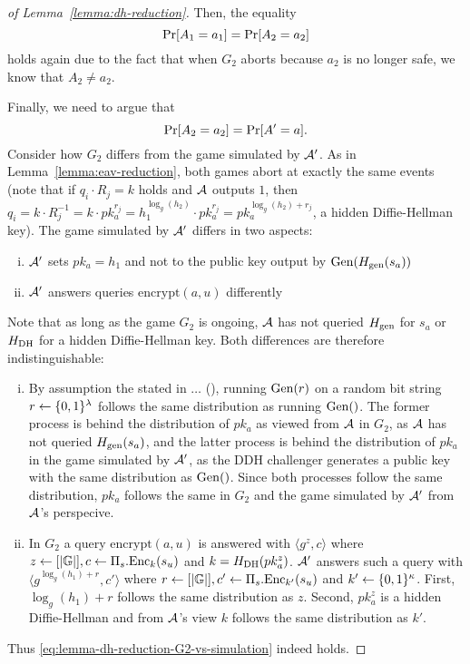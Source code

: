 \begin{proof}[of Lemma~\ref{lemma:dh-reduction}]
	Then, the equality
	\begin{equation} \label{eq:lemma-dh-reduction-G1-vs-G2}
		\pr{A_1 = a_1} = \pr{A_2 = a_2}
	\end{equation}
	holds again due to the fact that when $G_2$ aborts because $a_2$ is no longer safe, we know that $A_2 \neq a_2$.

	Finally, we need to argue that
	\begin{equation} \label{eq:lemma-dh-reduction-G2-vs-simulation}
		\pr{A_2 = a_2} = \pr{A' = a}.
	\end{equation}
	Consider how $G_2$ differs from the game simulated by $\mathcal{A}'$. As in Lemma~\ref{lemma:eav-reduction}, both games abort at exactly the same events (note that if $q_i \cdot R_j = k$ holds and $\mathcal{A}$ outputs $1$, then $q_i = k \cdot R_j^{-1} = k \cdot pk_a^{r_j} = h_1^{\log_g(h_2)} \cdot pk_a^{r_j} = pk_a^{\log_g(h_2) + r_j}$, a hidden Diffie-Hellman key). The game simulated by $\mathcal{A}'$ differs in two aspects:
	\begin{enumerate}[(i)]
		\item $\mathcal{A}'$ sets $pk_a = h_1$ and not to the public key output by $\mathrm{Gen}(H_\mathrm{gen}(s_a))$
		\item $\mathcal{A}'$ answers queries $\mathrm{encrypt}(a, u)$ differently
	\end{enumerate}
	Note that as long as the game $G_2$ is ongoing, $\mathcal{A}$ has not queried $H_\mathrm{gen}$ for $s_a$ or $H_\mathrm{DH}$ for a hidden Diffie-Hellman key. Both differences are therefore indistinguishable:
	\begin{enumerate}[(i)]
		\item By assumption the stated in $\ldots$ (), running $\mathrm{Gen}(r)$ on a random bit string $r \leftarrow \{0, 1\}^\lambda$ follows the same distribution as running $\mathrm{Gen}()$. The former process is behind the distribution of $pk_a$ as viewed from $\mathcal{A}$ in $G_2$, as $\mathcal{A}$ has not queried $H_\mathrm{gen}(s_a)$, and the latter process is behind the distribution of $pk_a$ in the game simulated by $\mathcal{A}'$, as the DDH challenger generates a public key with the same distribution as $\mathrm{Gen}()$. Since both processes follow the same distribution, $pk_a$ follows the same in $G_2$ and the game simulated by $\mathcal{A}'$ from $\mathcal{A}$'s perspecive.
		\item In $G_2$ a query $\mathrm{encrypt}(a, u)$ is answered with $\langle g^z, c \rangle$ where $z \leftarrow [\lvert\mathbb{G}\rvert], c \leftarrow \Pi_s.\mathrm{Enc}_k(s_u)$ and $k = H_\mathrm{DH}(pk_a^z)$. $\mathcal{A}'$ answers such a query with $\langle g^{\log_g(h_1) + r}, c' \rangle$ where $r \leftarrow [\lvert\mathbb{G}\rvert], c' \leftarrow \Pi_s.\mathrm{Enc}_{k'}(s_u)$ and $k' \leftarrow \{0, 1\}^\kappa$. First, $\log_g(h_1) + r$ follows the same distribution as $z$. Second, $pk_a^z$ is a hidden Diffie-Hellman and from $\mathcal{A}$'s view $k$ follows the same distribution as $k'$.
	\end{enumerate}
	Thus \eqref{eq:lemma-dh-reduction-G2-vs-simulation} indeed holds.


\end{proof}
